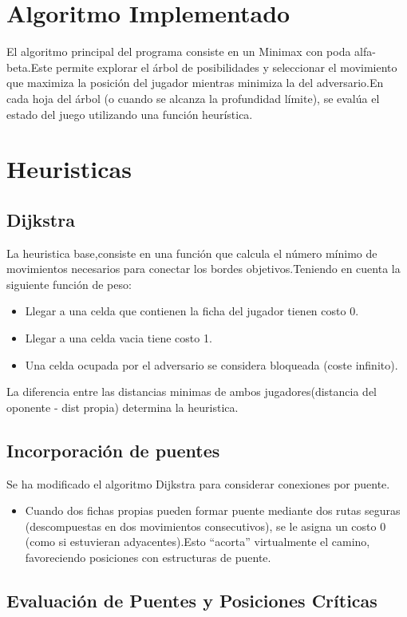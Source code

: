 \documentclass[a4paper,12pt]{article}
\begin{document}
	\section{Algoritmo Implementado}
	El algoritmo principal del programa consiste en un Minimax con poda alfa-beta.Este permite explorar el árbol de posibilidades y seleccionar el movimiento que maximiza la posición del jugador mientras minimiza la del adversario.En cada hoja del árbol (o cuando se alcanza la profundidad límite), se evalúa el estado del juego utilizando una función heurística.
	
	\section{Heuristicas}
	\subsection{Dijkstra}
		 La heuristica base,consiste en una función que calcula el número mínimo de movimientos necesarios para conectar los bordes objetivos.Teniendo en cuenta la siguiente función de peso:
		 \begin{itemize}
		 	\item Llegar a una celda que  contienen la ficha del jugador tienen costo 0.
		 	\item Llegar a una celda vacia tiene costo 1.
		 	\item  Una celda ocupada por el adversario se considera bloqueada (coste infinito).
		\end{itemize}
		La diferencia entre las distancias minimas  de ambos jugadores(distancia del oponente - dist propia) determina la heuristica.
		 \subsection{Incorporación de puentes}
		 Se ha modificado el algoritmo Dijkstra para considerar conexiones por puente.
		 \begin{itemize}
		 	\item Cuando dos fichas propias pueden formar puente mediante dos rutas seguras (descompuestas en dos movimientos consecutivos), se le asigna un costo 0 (como si estuvieran adyacentes).Esto “acorta” virtualmente el camino, favoreciendo posiciones con estructuras de puente.
		 \end{itemize}
		 \subsection{Evaluación de Puentes y Posiciones Críticas}
\end{document}
